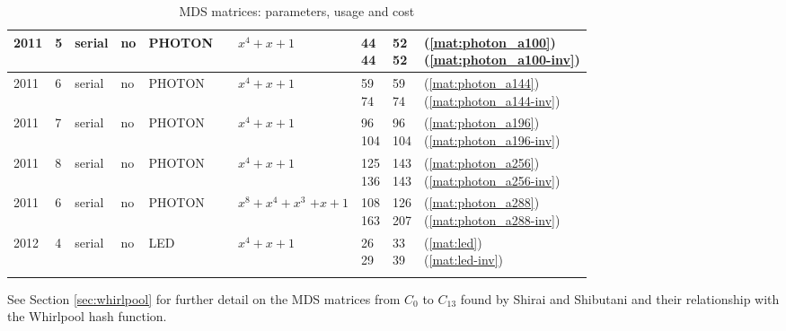 \begin{footnotesize}
\begin{longtable}[c]{|l|l|l|l|l|l|l|l|l|l|}
2011 & 5 & serial & no & PHOTON & \cite{PHOTON2011} & $x^4+x+1$ & \shortstack{44\\44} & \shortstack{52\\52} & \shortstack{(\ref{mat:photon_a100})\\(\ref{mat:photon_a100-inv})} \\ \hline
2011 & 6 & serial & no & PHOTON & \cite{PHOTON2011} & $x^4+x+1$ & \shortstack{59\\74} & \shortstack{59\\74} & \shortstack{(\ref{mat:photon_a144})\\(\ref{mat:photon_a144-inv})} \\ \hline
2011 & 7 & serial & no & PHOTON & \cite{PHOTON2011} & $x^4+x+1$ & \shortstack{96\\104} & \shortstack{96\\104} & \shortstack{(\ref{mat:photon_a196})\\(\ref{mat:photon_a196-inv})} \\ \hline
2011 & 8 & serial & no & PHOTON & \cite{PHOTON2011} & $x^4+x+1$ & \shortstack{125\\136} & \shortstack{143\\143} & \shortstack{(\ref{mat:photon_a256})\\(\ref{mat:photon_a256-inv})} \\ \hline
2011 & 6 & serial & no & PHOTON & \cite{PHOTON2011} & \shortstack{$x^8 + x^4 + x^3$\\$+ x + 1$} & \shortstack{108\\163} & \shortstack{126\\207} & \shortstack{(\ref{mat:photon_a288})\\(\ref{mat:photon_a288-inv})} \\ \hline

2012 & 4 & serial & no & LED & \cite{LED2012} & $x^4+x+1$ & \shortstack{26\\29} & \shortstack{33\\39} & \shortstack{(\ref{mat:led})\\(\ref{mat:led-inv})} \\ \hline

\caption{MDS matrices: parameters, usage and cost}\label{tbl:mds-list}
\end{longtable}
\end{footnotesize}

See Section \ref{sec:whirlpool} for further detail on the MDS matrices from $C_0$ to $C_{13}$ found by Shirai and Shibutani and their relationship with the Whirlpool hash function.
